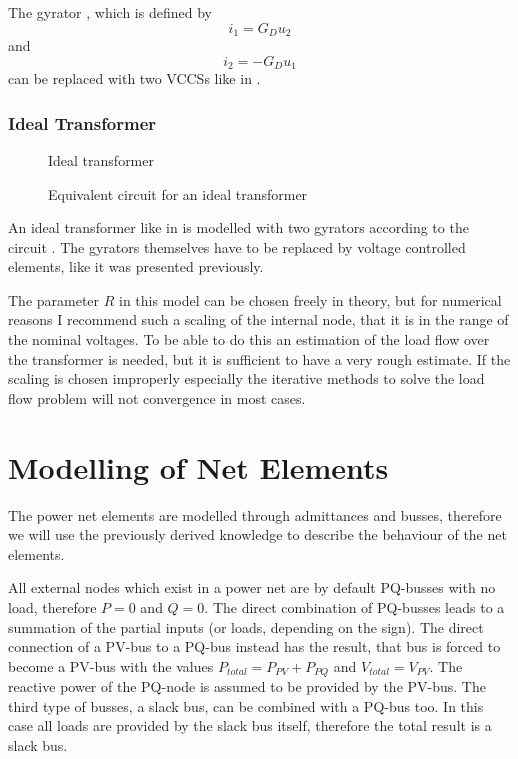 The gyrator , which is defined by
\begin{equation}
	i_1 = G_D u_2
\end{equation}
and
\begin{equation}
	i_2 = -G_D u_1
\end{equation}
can be replaced with two VCCSs like in .

\subsubsection{Ideal Transformer}

\begin{figure}
	\centering
	
	\caption{Ideal transformer}
	\label{fig:ideal_transformer_original}
\end{figure}

\begin{figure}
	\centering
	
	\caption{Equivalent circuit for an ideal transformer}
	\label{fig:ideal_transformer_equivalent}
\end{figure}

An ideal transformer like in  is modelled with two gyrators according to the circuit . The gyrators themselves have to be replaced by voltage controlled elements, like it was presented previously.

The parameter $R$ in this model can be chosen freely in theory, but for numerical reasons I recommend such a scaling of the internal node, that it is in the range of the nominal voltages. To be able to do this an estimation of the load flow over the transformer is needed, but it is sufficient to have a very rough estimate. If the scaling is chosen improperly especially the iterative methods to solve the load flow problem will not convergence in most cases.

\section{Modelling of Net Elements}

The power net elements are modelled through admittances and busses, therefore we will use the previously derived knowledge to describe the behaviour of the net elements.

All external nodes which exist in a power net are by default PQ-busses with no load, therefore $P = 0$ and $Q = 0$. The direct combination of PQ-busses leads to a summation of the partial inputs (or loads, depending on the sign). The direct connection of a PV-bus to a PQ-bus instead has the result, that bus is forced to become a PV-bus with the values $P_{total} = P_{PV} + P_{PQ}$ and $V_{total} = V_{PV}$. The reactive power of the PQ-node is assumed to be provided by the PV-bus. The third type of busses, a slack bus, can be combined with a PQ-bus too. In this case all loads are provided by the slack bus itself, therefore the total result is a slack bus.

